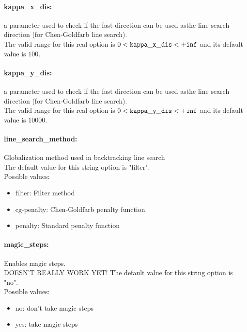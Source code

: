 \paragraph{kappa\_x\_dis:}\label{sec:kappa_x_dis} a parameter used to check if the fast direction can be used asthe line search direction (for Chen-Goldfarb line search). $\;$ \\
 The valid range for this real option is 
$0 <  {\tt kappa\_x\_dis } <  {\tt +inf}$
and its default value is $100$.


\paragraph{kappa\_y\_dis:}\label{sec:kappa_y_dis} a parameter used to check if the fast direction can be used asthe line search direction (for Chen-Goldfarb line search). $\;$ \\
 The valid range for this real option is 
$0 <  {\tt kappa\_y\_dis } <  {\tt +inf}$
and its default value is $10000$.


\paragraph{line\_search\_method:}\label{sec:line_search_method} Globalization method used in backtracking line search $\;$ \\

The default value for this string option is "filter".
\\ 
Possible values:
\begin{itemize}
   \item filter: Filter method
   \item cg-penalty: Chen-Goldfarb penalty function
   \item penalty: Standard penalty function
\end{itemize}

\paragraph{magic\_steps:}\label{sec:magic_steps} Enables magic steps. $\;$ \\
 DOESN'T REALLY WORK YET!
The default value for this string option is "no".
\\ 
Possible values:
\begin{itemize}
   \item no: don't take magic steps
   \item yes: take magic steps
\end{itemize}

